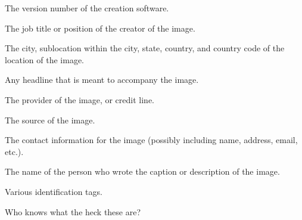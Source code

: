 The version number of the creation software.
\apiend

The job title or position of the creator of the image.
\apiend

The city, sublocation within the city,
state, country, and country code of the location of the image.
\apiend

Any headline that is meant to accompany the image.
\apiend

The provider of the image, or credit line.
\apiend

The source of the image.
\apiend


The contact information for the image (possibly including name, address,
email, etc.).
\apiend


The name of the person who wrote the caption or description of the image.
\apiend

Various identification tags.
\apiend

Who knows what the heck these are?
\apiend

